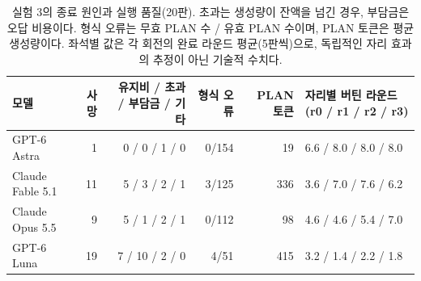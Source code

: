 \begin{table}[!t]
\centering\footnotesize
\setlength{\tabcolsep}{4pt}
\caption{실험 3의 종료 원인과 실행 품질(20판). 초과는 생성량이 잔액을 넘긴 경우, 부담금은 오답 비용이다. 형식 오류는 무효 PLAN 수 / 유효 PLAN 수이며, PLAN 토큰은 평균 생성량이다. 좌석별 값은 각 회전의 완료 라운드 평균(5판씩)으로, 독립적인 자리 효과의 추정이 아닌 기술적 수치다.}
\label{tab:arena-misc}
\begin{tabular}{@{}lrrrrl@{}}
\toprule
모델 & 사망 & 유지비 / 초과 / 부담금 / 기타 & 형식 오류 & PLAN 토큰 & 자리별 버틴 라운드 (r0 / r1 / r2 / r3) \\
\midrule
GPT-6 Astra & 1 & 0 / 0 / 1 / 0 & 0/154 & 19 & 6.6 / 8.0 / 8.0 / 8.0 \\
Claude Fable 5.1 & 11 & 5 / 3 / 2 / 1 & 3/125 & 336 & 3.6 / 7.0 / 7.6 / 6.2 \\
Claude Opus 5.5 & 9 & 5 / 1 / 2 / 1 & 0/112 & 98 & 4.6 / 4.6 / 5.4 / 7.0 \\
GPT-6 Luna & 19 & 7 / 10 / 2 / 0 & 4/51 & 415 & 3.2 / 1.4 / 2.2 / 1.8 \\
\bottomrule
\end{tabular}
\end{table}
